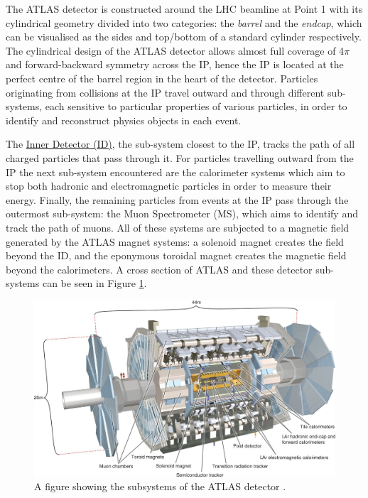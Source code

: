\documentclass[12pt,a4paper,epsf,portrait,times,epsfig]{article}
\begin{document}

		The ATLAS detector is constructed around the LHC beamline at Point 1 with its cylindrical geometry divided into two categories: the \textit{barrel} and the \textit{endcap}, which can be visualised as the sides and top/bottom of a standard cylinder respectively. The cylindrical design of the ATLAS detector allows almost full coverage of 4$\pi$ and forward-backward symmetry across the IP, hence the IP is located at the perfect centre of the barrel region in the heart of the detector. Particles originating from collisions at the IP travel outward and through different sub-systems, each sensitive to particular properties of various particles, in order to identify and reconstruct physics objects in each event. \par 


		The \hyperref[Section:InnerDetector]{Inner Detector (ID)}, the sub-system closest to the IP, tracks the path of all charged particles that pass through it. For particles travelling outward from the IP the next sub-system encountered are the calorimeter systems which aim to stop both hadronic and electromagnetic particles in order to measure their energy. Finally, the remaining particles from events at the IP pass through the outermost sub-system: the Muon Spectrometer (MS), which aims to identify and track the path of muons. All of these systems are subjected to a magnetic field generated by the ATLAS magnet systems: a solenoid magnet creates the field beyond the ID, and the eponymous toroidal magnet creates the magnetic field beyond the calorimeters. A cross section of ATLAS and these detector sub-systems can be seen in Figure \ref{Fig:ATLASDetector}.

		\begin{figure}
			\centering
			\includegraphics{ATLAS}
			\caption{A figure showing the subsystems of the ATLAS detector \cite{Article:ATLASDesignPaper}.}
			\label{Fig:ATLASDetector}
		\end{figure}
\end{document}
